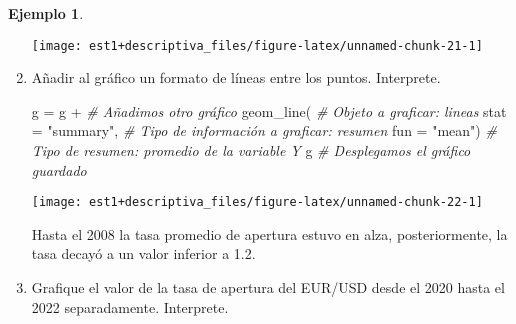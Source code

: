 \documentclass[
]{book}
\newenvironment{Shaded}{\begin{snugshade}}{\end{snugshade}}
\newcommand{\AttributeTok}[1]{\textcolor[rgb]{0.77,0.63,0.00}{#1}}
\newcommand{\CommentTok}[1]{\textcolor[rgb]{0.56,0.35,0.01}{\textit{#1}}}
\newcommand{\FunctionTok}[1]{\textcolor[rgb]{0.00,0.00,0.00}{#1}}
\newcommand{\NormalTok}[1]{#1}
\newcommand{\OtherTok}[1]{\textcolor[rgb]{0.56,0.35,0.01}{#1}}
\newcommand{\SpecialCharTok}[1]{\textcolor[rgb]{0.00,0.00,0.00}{#1}}
\newcommand{\StringTok}[1]{\textcolor[rgb]{0.31,0.60,0.02}{#1}}
\theoremstyle{definition}
\theoremstyle{definition}
\newtheorem{example}{Ejemplo}[chapter]
\theoremstyle{definition}
\theoremstyle{definition}
\theoremstyle{remark}
\begin{document}
\begin{example}
\begin{enumerate}
  \begin{center}\texttt{[image: est1+descriptiva\_files/figure-latex/unnamed-chunk-21-1]} \end{center}
\item
  Añadir al gráfico un formato de líneas entre los puntos. Interprete.

\begin{Shaded}
\begin{Highlighting}[]
\NormalTok{g }\OtherTok{=}\NormalTok{ g }\SpecialCharTok{+} \CommentTok{\# Añadimos otro gráfico}
  \FunctionTok{geom\_line}\NormalTok{( }\CommentTok{\# Objeto a graficar: lineas}
\AttributeTok{stat =} \StringTok{"summary"}\NormalTok{, }\CommentTok{\# Tipo de información a graficar: resumen}
\AttributeTok{fun =} \StringTok{"mean"}\NormalTok{) }\CommentTok{\# Tipo de resumen: promedio de la variable Y}
\NormalTok{g }\CommentTok{\# Desplegamos el gráfico guardado}
\end{Highlighting}
\end{Shaded}

  \begin{center}\texttt{[image: est1+descriptiva\_files/figure-latex/unnamed-chunk-22-1]} \end{center}

  Hasta el 2008 la tasa promedio de apertura estuvo en alza, posteriormente, la tasa decayó a un valor inferior a 1.2.
\item
  Grafique el valor de la tasa de apertura del EUR/USD desde el 2020 hasta el 2022 separadamente. Interprete.


\end{enumerate}
\end{example}
\end{document}
